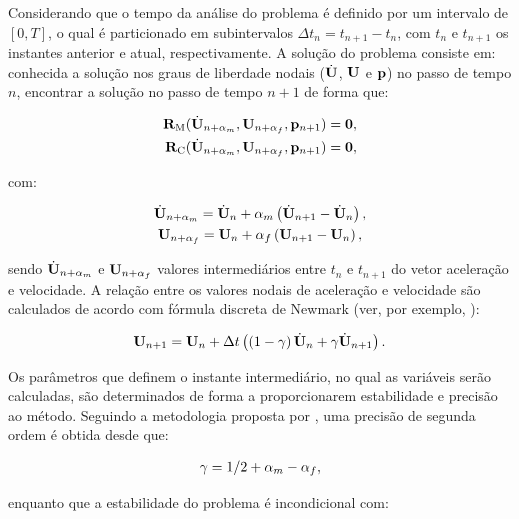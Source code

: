 \documentclass[tese_patricia]{subfiles}%
\begin{document}
Considerando que o tempo da análise do problema é definido por um intervalo de $[0,T]$, o qual é particionado em subintervalos $\Delta t_{n} = t_{n+1} - t_{n}$, com $t_{n}$ e $t_{n+1}$ os instantes anterior e atual, respectivamente. A solução do problema consiste em: conhecida a solução nos graus de liberdade nodais ($\dot{\mathbf{U}}$, $\mathbf{U}$ e $\mathbf{p}$) no passo de tempo $n$, encontrar a solução no passo de tempo $n+1$ de forma que:

\begin{align}
\mathbf{R}_\mathrm{M}(\dot{\mathbf{U}}_{n+\alpha_m},\mathbf{U}_{n+\alpha_f},\mathbf{p}_{n+1}) = \mathbf{0}, \label{eq:momentum_residual_alpha}\\
\mathbf{R}_\mathrm{C}(\dot{\mathbf{U}}_{n+\alpha_m},\mathbf{U}_{n+\alpha_f},\mathbf{p}_{n+1}) = \mathbf{0}, \label{eq:continuity_residual_alpha}
\end{align}

\noindent com:

\begin{gather}
\dot{\mathbf{U}}_{n+\alpha_m} = \dot{\mathbf{U}}_n + \alpha_m \left( \dot{\mathbf{U}}_{n+1} - \dot{\mathbf{U}}_n \right), \label{eq:approx_acceleration}\\
\mathbf{U}_{n+\alpha_f} = \mathbf{U}_n + \alpha_f \left( \mathbf{U}_{n+1} - \mathbf{U}_n \right), \label{eq:approx_velocity}
\end{gather}

\noindent sendo $\dot{\mathbf{U}}_{n+\alpha_m}$ e $\mathbf{U}_{n+\alpha_f}$ valores intermediários entre $t_{n}$ e $t_{n+1}$ do vetor aceleração e velocidade. A relação entre os valores nodais de aceleração e velocidade são calculados de acordo com fórmula discreta de Newmark (ver, por exemplo, \cite{Hughes:1976}):

\begin{gather}
\mathbf{U}_{n+1} = \mathbf{U}_n + \Delta t\left(\left(1-\gamma\right)\dot{\mathbf{U}}_n + \gamma\dot{\mathbf{U}}_{n+1} \right). \label{eq:newmark}
\end{gather}

Os parâmetros que definem o instante intermediário, no qual as variáveis serão calculadas, são determinados de forma a proporcionarem estabilidade e precisão ao método. Seguindo a metodologia proposta por , uma precisão de segunda ordem é obtida desde que: 

\begin{gather}
\gamma = 1/2 + \alpha_m - \alpha_f,\label{eq:gamma}
\end{gather}

\noindent enquanto que a estabilidade do problema é incondicional com:
\end{document}
